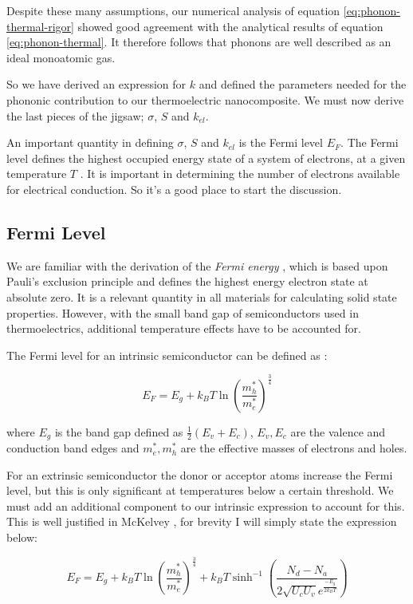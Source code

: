 \documentclass[12pt]{article}
\begin{document}
Despite these many assumptions, our numerical analysis of equation \eqref{eq:phonon-thermal-rigor} showed good agreement with the analytical results of equation \eqref{eq:phonon-thermal}. It therefore follows that phonons are well described as an ideal monoatomic gas.

So we have derived an expression for $k$ and defined the parameters needed for the phononic contribution to our thermoelectric nanocomposite. We must now derive the last pieces of the jigsaw; $\sigma$, $S$ and $k_{el}$.

An important quantity in defining $\sigma$, $S$ and $k_{el}$ is the Fermi level $E_F$. The Fermi level defines the highest occupied energy state of a system of electrons, at a given temperature $T$ \cite{kittel}. It is important in determining the number of electrons available for electrical conduction. So it's a good place to start the discussion.

\subsection{Fermi Level}
We are familiar with the derivation of the \emph{Fermi energy} \cite{kittel}, which is based upon Pauli's exclusion principle and defines the highest energy electron state at absolute zero. It is a relevant quantity in all materials for calculating solid state properties. However, with the small band gap of semiconductors used in thermoelectrics, additional temperature effects have to be accounted for.

The Fermi level for an intrinsic semiconductor can be defined as \cite{mckelvey}:

\begin{equation}
\label{eq:intrinsic-fermi}
	E_F = E_g + k_B T\ln\left(\frac{m^*_h}{m^*_e}\right)^\frac{3}{4}
\end{equation}

where $E_g$ is the band gap defined as $\frac{1}{2} (E_v + E_c)$, $E_v, E_c$ are the valence and conduction band edges and $m^*_e, m^*_h$ are the effective masses of electrons and holes.

For an extrinsic semiconductor the donor or acceptor atoms increase the Fermi level, but this is only significant at temperatures below a certain threshold. We must add an additional component to our intrinsic expression to account for this. This is well justified in McKelvey \cite{mckelvey}, for brevity I will simply state the expression below:

\begin{equation}
\label{eq:extrinsic-fermi}
	E_F = E_g + k_B T\ln\left(\frac{m^*_h}{m^*_e}\right)^\frac{3}{4} + k_BT\sinh^{-1} \left(\frac{N_d-N_a}{2\sqrt{U_cU_v}e^{\frac{-E_g}{2k_BT}}}\right)
\end{equation}
\end{document}
